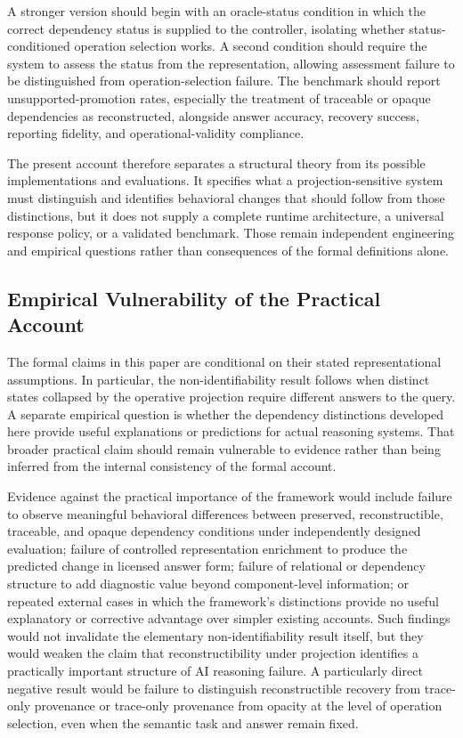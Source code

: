 \documentclass[11pt]{article}
\theoremstyle{definition}
\theoremstyle{remark}
\begin{document}
A stronger version should begin with an oracle-status condition in which the correct dependency status is supplied to the controller, isolating whether status-conditioned operation selection works. A second condition should require the system to assess the status from the representation, allowing assessment failure to be distinguished from operation-selection failure. The benchmark should report unsupported-promotion rates, especially the treatment of traceable or opaque dependencies as reconstructed, alongside answer accuracy, recovery success, reporting fidelity, and operational-validity compliance.

The present account therefore separates a structural theory from its possible implementations and evaluations. It specifies what a projection-sensitive system must distinguish and identifies behavioral changes that should follow from those distinctions, but it does not supply a complete runtime architecture, a universal response policy, or a validated benchmark. Those remain independent engineering and empirical questions rather than consequences of the formal definitions alone.

\subsection{Empirical Vulnerability of the Practical Account}

The formal claims in this paper are conditional on their stated representational assumptions. In particular, the non-identifiability result follows when distinct states collapsed by the operative projection require different answers to the query. A separate empirical question is whether the dependency distinctions developed here provide useful explanations or predictions for actual reasoning systems. That broader practical claim should remain vulnerable to evidence rather than being inferred from the internal consistency of the formal account.

Evidence against the practical importance of the framework would include failure to observe meaningful behavioral differences between preserved, reconstructible, traceable, and opaque dependency conditions under independently designed evaluation; failure of controlled representation enrichment to produce the predicted change in licensed answer form; failure of relational or dependency structure to add diagnostic value beyond component-level information; or repeated external cases in which the framework's distinctions provide no useful explanatory or corrective advantage over simpler existing accounts. Such findings would not invalidate the elementary non-identifiability result itself, but they would weaken the claim that reconstructibility under projection identifies a practically important structure of AI reasoning failure. A particularly direct negative result would be failure to distinguish reconstructible recovery from trace-only provenance or trace-only provenance from opacity at the level of operation selection, even when the semantic task and answer remain fixed.
\end{document}
